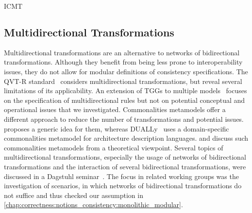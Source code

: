 \begin{copiedFrom}{ICMT}
\subsection*{Multidirectional Transformations}
Multidirectional transformations 
are an alternative to networks of bidirectional transformations.
Although they benefit from being less prone to interoperability issues, they do not allow for modular definitions of consistency specifications.
The QVT-R standard~\cite{qvt} considers multidirectional transformations, but \textcite{macedo2014FrameworkMultiDirectional-BX} reveal several limitations of its applicability.
An extension of \glspl{TGG} to multiple models~\cite{trollmann2015TransformationTGGtoMultiModel-ICMT, trollmann2016SynchronizationTGGtoMultiModel-ICMT} focuses on the specification of multidirectional rules but not on potential conceptual and operational issues that we investigated.
Commonalities metamodels offer a different approach to reduce the number of transformations and potential issues.
\textcite{gleitze2017a} proposes a generic idea for them, whereas DUALLy~\cite{malavolta2010ADLInteroperability-TSE, eramo2012Dually-SoSym} uses a domain-specific commonalities metamodel for architecture description languages.
\textcite{stunkel2018MultimodelCorrespondence-ICPS} and \textcite{diskin2018MultiModelSynchronization-FASE} discuss such commonalities metamodels from a theoretical viewpoint.
Several topics of multidirectional transformations, especially the usage of networks of bidirectional transformations and the interaction of several bidirectional transformations, were discussed in a Dagstuhl seminar~\cite{cleve2019dagstuhl}.
The focus in related working groups was the investigation of scenarios, in which networks of bidirectional transformations do not suffice and thus checked our assumption in \autoref{chap:correctness:notions_consistency:monolithic_modular}.



\end{copiedFrom}
